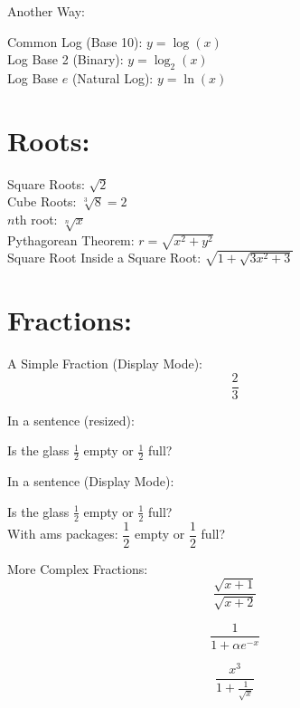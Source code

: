 \documentclass[11pt]{article} %
\begin{document}
Another Way:

\begin{center}
    Common Log (Base 10): $ y = \log (x) $\\[14pt] %
    Log Base 2 (Binary): $y = \log_{2}(x) $\\[14pt]
    Log Base $e$ (Natural Log): $ y = \ln (x) $
\end{center}

\section{Roots:}
\begin{center}
    Square Roots: $ \sqrt{2} $\\[14pt]
    Cube Roots: $ \sqrt[3]{8} = 2 $\\[14pt]
    $n$th root: $\sqrt[n]{x}$\\[14pt]
    Pythagorean Theorem: $ r = \sqrt{x^2 + y^2} $\\[14pt]
    Square Root Inside a Square Root: $ \sqrt{1 + \sqrt{3x^2 + 3}} $
\end{center}

\section{Fractions:}

A Simple Fraction (Display Mode): $$ \frac{2}{3} $$

In a sentence (resized):

\begin{center}
    Is the glass $\frac{1}{2}$ empty or $\frac{1}{2}$ full?
\end{center}

In a sentence (Display Mode):
\begin{center}
    Is the glass $\displaystyle \frac{1}{2}$ empty or $\displaystyle \frac{1}{2}$ full?\\[14pt]
    With ams packages: $\dfrac{1}{2}$ empty or $\dfrac{1}{2}$ full?\\[14pt]
\end{center}

\pagebreak

More Complex Fractions: 
$$ \frac{\sqrt{x+1}}{\sqrt{x+2}} $$

$$ \frac{1}{1 + \alpha e^{-x}} $$

$$ \frac{x^3}{1 + \frac{1}{\sqrt{x}}} $$
\end{document}
